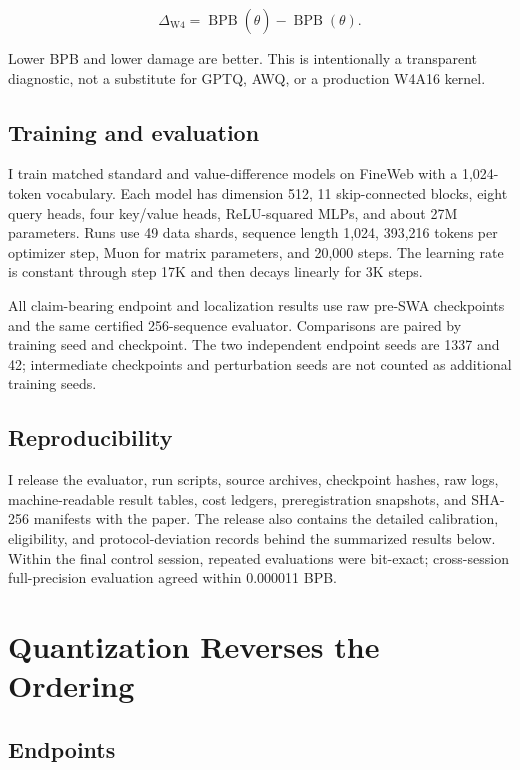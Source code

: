 \documentclass[10pt]{article}
\begin{document}
\[
\Delta_{\mathrm{W4}}
=\operatorname{BPB}(\widehat\theta)-\operatorname{BPB}(\theta).
\]

Lower BPB and lower damage are better. This is intentionally a transparent diagnostic, not a substitute for GPTQ, AWQ, or a production W4A16 kernel.

\subsection{Training and evaluation}\label{training-and-evaluation}

I train matched standard and value-difference models on FineWeb with a 1,024-token vocabulary. Each model has dimension 512, 11 skip-connected blocks, eight query heads, four key/value heads, ReLU-squared MLPs, and about 27M parameters. Runs use 49 data shards, sequence length 1,024, 393,216 tokens per optimizer step, Muon for matrix parameters, and 20,000 steps. The learning rate is constant through step 17K and then decays linearly for 3K steps.

All claim-bearing endpoint and localization results use raw pre-SWA checkpoints and the same certified 256-sequence evaluator. Comparisons are paired by training seed and checkpoint. The two independent endpoint seeds are 1337 and 42; intermediate checkpoints and perturbation seeds are not counted as additional training seeds.

\subsection{Reproducibility}\label{reproducibility}

I release the evaluator, run scripts, source archives, checkpoint hashes, raw logs, machine-readable result tables, cost ledgers, preregistration snapshots, and SHA-256 manifests with the paper. The release also contains the detailed calibration, eligibility, and protocol-deviation records behind the summarized results below. Within the final control session, repeated evaluations were bit-exact; cross-session full-precision evaluation agreed within 0.000011 BPB.

\section{Quantization Reverses the Ordering}\label{quantization-reverses-the-ordering}

\subsection{Endpoints}\label{endpoints}
\end{document}
